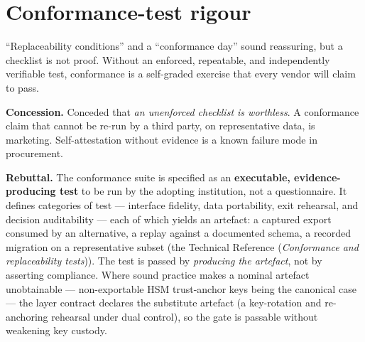 \documentclass[11pt,a4paper,twoside]{book}
\newcommand{\keyword}[1]{\textbf{#1}}
\newcommand{\trref}[1]{the Technical Reference (\emph{#1})}
\begin{document}
\section{Conformance-test rigour}
\label{sec:arg-conformance}

\begin{questionbox}
``Replaceability conditions'' and a ``conformance day'' sound reassuring, but
a checklist is not proof. Without an enforced, repeatable, and independently
verifiable test, conformance is a self-graded exercise that every vendor will
claim to pass.
\end{questionbox}

\begin{answerbox}[Response O6.1]
\textbf{Concession.} Conceded that \emph{an unenforced checklist is
worthless}. A conformance claim that cannot be re-run by a third party, on
representative data, is marketing. Self-attestation without evidence is a
known failure mode in procurement.

\medskip
\textbf{Rebuttal.} The conformance suite is specified as an
\keyword{executable, evidence-producing test} to be run by the adopting
institution, not a questionnaire. It
defines categories of test --- interface fidelity, data portability, exit
rehearsal, and decision auditability --- each of which yields an artefact: a
captured export consumed by an alternative, a replay against a documented
schema, a recorded migration on a representative subset
(\trref{Conformance and replaceability tests}). The test is passed by
\emph{producing the artefact}, not by asserting compliance. Where
sound practice makes a nominal artefact unobtainable ---
non-exportable HSM trust-anchor keys being the canonical case ---
the layer contract declares the substitute artefact (a key-rotation
and re-anchoring rehearsal under dual control), so the gate is
passable without weakening key custody.


\end{answerbox}
\end{document}
